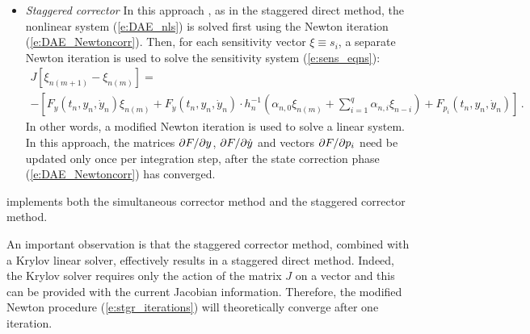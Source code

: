 \begin{itemize}
\item {\em Staggered corrector}
  In this approach \cite{FTB:97}, as in the staggered direct method,
  the nonlinear system (\ref{e:DAE_nls}) is solved first using the Newton
  iteration (\ref{e:DAE_Newtoncorr}). Then, for each sensitivity vector $\xi \equiv s_i$,
  a separate Newton iteration is used to solve the sensitivity system (\ref{e:sens_eqns}):
  \begin{multline}\label{e:stgr_iterations}
    J [\xi_{n(m+1)} - \xi_{n(m)}]= \\
    - \left[
      F_y (t_n, y_n, \dot y_n) \xi_{n(m)}
      + F_{\dot y} (t_n, y_n, \dot y_n) \cdot
      h_n^{-1} \left(
        \alpha_{n,0} \xi_{n(m)} + \sum_{i=1}^q \alpha_{n,i} \xi_{n-i}
      \right) 
      + F_{p_i} (t_n, y_n, \dot y_n)
    \right] \, .
  \end{multline}
  In other words, a modified Newton iteration is used to solve a linear system.
  In this approach, the matrices $\partial F / \partial y$, $\partial F / \partial \dot y$ and vectors $\partial F / \partial p_i$ need 
  be updated only once per integration step, after the state correction phase 
  (\ref{e:DAE_Newtoncorr}) has converged.
\end{itemize}  
{\idas} implements both the simultaneous corrector method and the staggered
corrector method.

An important observation is that the staggered corrector method, combined with 
a Krylov linear solver, effectively results in a staggered direct method. 
Indeed, the Krylov solver requires only the action of the matrix $J$ on a vector
and this can be provided with the current Jacobian information. Therefore, the
modified Newton procedure (\ref{e:stgr_iterations}) will theoretically converge 
after one iteration.

